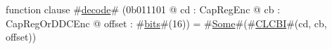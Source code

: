 function clause #\hyperref[zdecode]{decode}# (0b011101 @ cd : CapRegEnc @ cb : CapRegOrDDCEnc @ offset : #\hyperref[zbits]{bits}#(16)) = #\hyperref[zSome]{Some}#(#\hyperref[zCLCBI]{CLCBI}#(cd, cb, offset))

